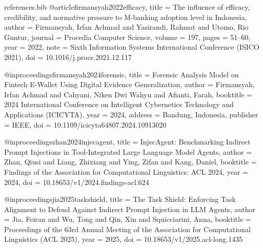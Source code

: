 \begin{filecontents*}{references.bib}
@article{firmansyah2022efficacy,
  title   = {The influence of efficacy, credibility, and normative pressure to
             {M}-banking adoption level in {Indonesia}},
  author  = {Firmansyah, Irfan Achmad and Yasirandi, Rahmat and Utomo, Rio Guntur},
  journal = {Procedia Computer Science},
  volume  = {197},
  pages   = {51--60},
  year    = {2022},
  note    = {Sixth Information Systems International Conference ({ISICO} 2021)},
  doi     = {10.1016/j.procs.2021.12.117}
}

@inproceedings{firmansyah2024forensic,
  title     = {Forensic Analysis Model on Fintech E-Wallet Using Digital Evidence Generalization},
  author    = {Firmansyah, Irfan Achmad and Cahyani, Niken Dwi Wahyu and Afianti, Farah},
  booktitle = {2024 International Conference on Intelligent Cybernetics Technology
               and Applications ({ICICYTA})},
  year      = {2024},
  address   = {Bandung, Indonesia},
  publisher = {{IEEE}},
  doi       = {10.1109/icicyta64807.2024.10913020}
}

@inproceedings{zhan2024injecagent,
  title     = {{InjecAgent}: Benchmarking Indirect Prompt Injections in
               Tool-Integrated Large Language Model Agents},
  author    = {Zhan, Qiusi and Liang, Zhixiang and Ying, Zifan and Kang, Daniel},
  booktitle = {Findings of the Association for Computational Linguistics: {ACL} 2024},
  year      = {2024},
  doi       = {10.18653/v1/2024.findings-acl.624}
}

@inproceedings{jia2025taskshield,
  title     = {The Task Shield: Enforcing Task Alignment to Defend Against Indirect
               Prompt Injection in {LLM} Agents},
  author    = {Jia, Feiran and Wu, Tong and Qin, Xin and Squicciarini, Anna},
  booktitle = {Proceedings of the 63rd Annual Meeting of the Association for
               Computational Linguistics ({ACL} 2025)},
  year      = {2025},
  doi       = {10.18653/v1/2025.acl-long.1435}
}


\end{filecontents*}
